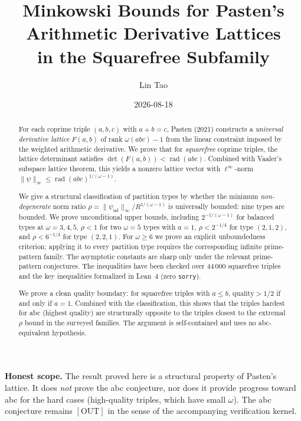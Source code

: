 \documentclass[12pt]{article}
\title{Minkowski Bounds for Pasten's Arithmetic Derivative Lattices\\
       in the Squarefree Subfamily}
\author{Lin Tao}
\date{2026-08-18}
\theoremstyle{definition}
\DeclareMathOperator{\rad}{rad}
\begin{document}
\maketitle

\begin{abstract}
For each coprime triple $(a,b,c)$ with $a+b=c$, Pasten (2021) constructs a
\emph{universal derivative lattice} $F(a,b)$ of rank $\omega(abc)-1$ from the
linear constraint imposed by the weighted arithmetic derivative.  We prove that
for \emph{squarefree} coprime triples, the lattice determinant satisfies
$\det(F(a,b)) < \rad(abc)$.
Combined with Vaaler's subspace lattice theorem, this yields a nonzero lattice
vector with $\ell^\infty$-norm $\|\psi\|_\infty \le \rad(abc)^{1/(\omega-1)}$.

We give a structural classification of partition types by whether the minimum
\emph{non-degenerate} norm ratio $\rho = \|\psi_\mathrm{nd}\|_\infty/R^{1/(\omega-1)}$
is universally bounded: nine types are bounded.  We prove unconditional
upper bounds, including $2^{-1/(\omega-1)}$ for balanced types at
$\omega = 3, 4, 5$, $\rho<1$ for two $\omega=5$ types with $a=1$,
$\rho<2^{-1/4}$ for type $(2,1,2)$, and $\rho<6^{-1/4}$ for type $(2,2,1)$.
For $\omega\ge6$ we prove an explicit unboundedness criterion; applying it to
every partition type requires the corresponding infinite prime-pattern family.
The asymptotic constants are sharp only under the relevant prime-pattern
conjectures.  The inequalities have been checked over 44\,000 squarefree
triples and the key inequalities formalized in Lean~4 (zero \texttt{sorry}).

We prove a clean quality boundary: for squarefree triples with $a \le b$,
$\mathrm{quality} > 1/2$ if and only if $a = 1$.  Combined with the classification,
this shows that the triples hardest for abc (highest quality) are structurally opposite
to the triples closest to the extremal $\rho$ bound in the surveyed families.
The argument is self-contained
and uses no abc-equivalent hypothesis.
\end{abstract}

\tableofcontents
\bigskip

\noindent\textbf{Honest scope.}
The result proved here is a structural property of Pasten's lattice.
It does \emph{not} prove the abc conjecture, nor does it provide progress
toward abc for the hard cases (high-quality triples, which have small $\omega$).
The abc conjecture remains $[\mathrm{OUT}]$ in the sense of the accompanying
verification kernel.
\end{document}
